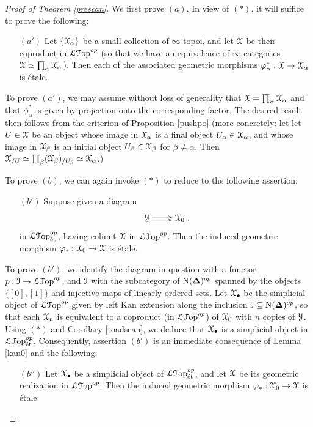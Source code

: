 \begin{proof}[Proof of Theorem \ref{prescan}]
We first prove $(a)$. In view of $(\ast)$, it will suffice to prove the following:
\begin{itemize}
\item[$(a')$] Let $\{ \operatorname{\mathcal{X}}_{\alpha} \}$ be a small collection of $\infty$-topoi, and let
$\operatorname{\mathcal{X}}$ be their coproduct in $\operatorname{\mathcal{L}{\mathcal T}op}^{op}$ (so that we have an equivalence of $\infty$-categories $\operatorname{\mathcal{X}} \simeq \prod_{\alpha} \operatorname{\mathcal{X}}_{\alpha}$). Then each of the associated geometric morphisms
$\varphi_{\alpha}^{\ast}: \operatorname{\mathcal{X}} \rightarrow \operatorname{\mathcal{X}}_{\alpha}$ is \'{e}tale.
\end{itemize}
To prove $(a')$, we may assume without loss of generality that $\operatorname{\mathcal{X}} = \prod_{\alpha} \operatorname{\mathcal{X}}_{\alpha}$
and that $\phi_{\alpha}^{\ast}$ is given by projection onto the corresponding factor. The desired
result then follows from the criterion of Proposition \ref{pushpo} (more concretely: let
let $U \in \operatorname{\mathcal{X}}$ be an object whose image in $\operatorname{\mathcal{X}}_{\alpha}$ is
a final object $U_{\alpha} \in \operatorname{\mathcal{X}}_{\alpha}$, and whose image in $\operatorname{\mathcal{X}}_{\beta}$ is an initial object 
$U_{\beta} \in \operatorname{\mathcal{X}}_{\beta}$ for $\beta \neq \alpha$. Then $\operatorname{\mathcal{X}}_{/U} \simeq \prod_{\beta} (\operatorname{\mathcal{X}}_{\beta})_{/U_{\beta}} \simeq \operatorname{\mathcal{X}}_{\alpha}$.) 

To prove $(b)$, we can again invoke $(\ast)$ to reduce to the following assertion:
\begin{itemize}
\item[$(b')$] Suppose given a diagram
$$\xymatrix{ \calY \ar@<.4ex>[r] \ar@<-.4ex>[r] & \calX_0}.$$
in $\operatorname{\mathcal{L}{\mathcal T}op}_{\text{\'{e}t}}^{op}$, having colimit $\operatorname{\mathcal{X}}$ in $\operatorname{\mathcal{L}{\mathcal T}op}^{op}$. Then
the induced geometric morphism $\varphi_{\ast}: \operatorname{\mathcal{X}}_0 \rightarrow \operatorname{\mathcal{X}}$ is \'{e}tale.
\end{itemize}

To prove $(b')$, we identify the diagram in question with a functor
$p: \operatorname{\mathcal{I}} \rightarrow \operatorname{\mathcal{L}{\mathcal T}op}^{op}$, and $\operatorname{\mathcal{I}}$ with the subcategory of
$\operatorname{N}(\operatorname{{\bf \Delta}})^{op}$ spanned by the objects $\{ [0], [1] \}$ and injective maps of linearly ordered sets.
Let $\operatorname{\mathcal{X}}_{\bullet}$ be the simplicial object of $\operatorname{\mathcal{L}{\mathcal T}op}^{op}$ given by left Kan extension along
the inclusion $\operatorname{\mathcal{I}} \subseteq \operatorname{N}(\operatorname{{\bf \Delta}})^{op}$, so that each $\operatorname{\mathcal{X}}_{n}$ is equivalent to a coproduct (in $\operatorname{\mathcal{L}{\mathcal T}op}^{op}$) of $\operatorname{\mathcal{X}}_0$ with $n$ copies of $\operatorname{\mathcal{Y}}$. Using $(\ast)$ and Corollary \ref{toadscan}, we deduce that $\operatorname{\mathcal{X}}_{\bullet}$ is a simplicial object in $\operatorname{\mathcal{L}{\mathcal T}op}^{op}_{\text{\'{e}t}}$.
Consequently, assertion $(b')$ is an immediate consequence of Lemma \ref{kan0} and
the following:
\begin{itemize}
\item[$(b'')$] Let $\operatorname{\mathcal{X}}_{\bullet}$ be a simplicial object of $\operatorname{\mathcal{L}{\mathcal T}op}^{op}_{\text{\'{e}t}}$, and let
$\operatorname{\mathcal{X}}$ be its geometric realization in $\operatorname{\mathcal{L}{\mathcal T}op}^{op}$. Then the induced geometric morphism
$\varphi_{\ast}: \operatorname{\mathcal{X}}_0 \rightarrow \operatorname{\mathcal{X}}$ is \'{e}tale.
\end{itemize}


\end{proof}
